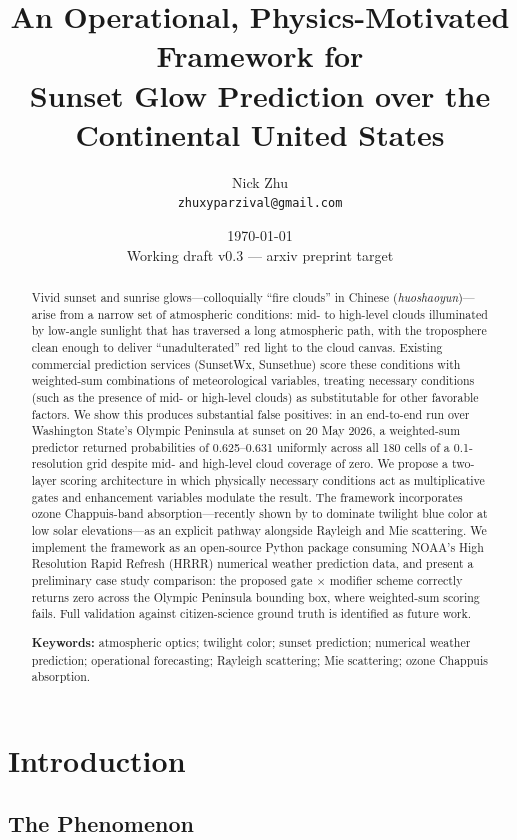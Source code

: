 \documentclass[11pt,a4paper]{article}
\title{An Operational, Physics-Motivated Framework for\\
Sunset Glow Prediction over the Continental United States}
\author{Nick Zhu \\ \small\texttt{zhuxyparzival@gmail.com}}
\date{\today\\\small Working draft v0.3 --- arxiv preprint target}
\begin{document}
\maketitle

\begin{abstract}
Vivid sunset and sunrise glows---colloquially ``fire clouds'' in Chinese (\textit{huoshaoyun})---arise from a narrow set of atmospheric conditions: mid- to high-level clouds illuminated by low-angle sunlight that has traversed a long atmospheric path, with the troposphere clean enough to deliver ``unadulterated'' red light to the cloud canvas. Existing commercial prediction services (SunsetWx, Sunsethue) score these conditions with weighted-sum combinations of meteorological variables, treating necessary conditions (such as the presence of mid- or high-level clouds) as substitutable for other favorable factors. We show this produces substantial false positives: in an end-to-end run over Washington State's Olympic Peninsula at sunset on 20 May 2026, a weighted-sum predictor returned probabilities of 0.625--0.631 uniformly across all 180 cells of a 0.1\textdegree{}-resolution grid despite mid- and high-level cloud coverage of zero. We propose a two-layer scoring architecture in which physically necessary conditions act as multiplicative gates and enhancement variables modulate the result. The framework incorporates ozone Chappuis-band absorption---recently shown by \citet{lange2023revisiting} to dominate twilight blue color at low solar elevations---as an explicit pathway alongside Rayleigh and Mie scattering. We implement the framework as an open-source Python package consuming NOAA's High Resolution Rapid Refresh (HRRR) numerical weather prediction data, and present a preliminary case study comparison: the proposed gate $\times$ modifier scheme correctly returns zero across the Olympic Peninsula bounding box, where weighted-sum scoring fails. Full validation against citizen-science ground truth is identified as future work.

\medskip
\noindent\textbf{Keywords:} atmospheric optics; twilight color; sunset prediction; numerical weather prediction; operational forecasting; Rayleigh scattering; Mie scattering; ozone Chappuis absorption.
\end{abstract}

\section{Introduction}

\subsection{The Phenomenon}
\end{document}
